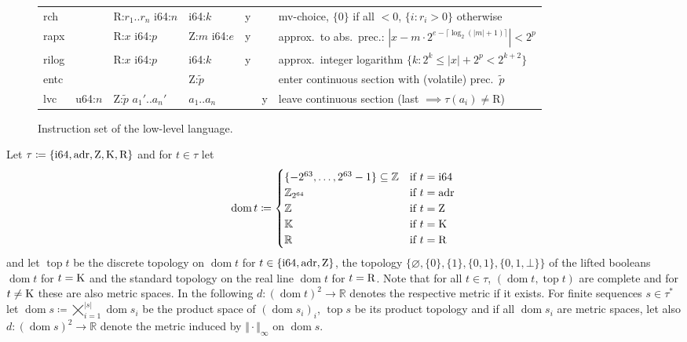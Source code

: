 \documentclass[a4paper,parskip=half]{scrartcl}
\begin{document}
\begin{figure}[h]
\begin{tabular}{l|l|l|l@{\;\,\vline\,}c@{\,\vline\,}c@{\,\vline\;\,}l}
  \ttfamily rch   &         & R:$r_1..r_n$ i64:$n$ & i64:$k$    &y&& mv-choice, $\{0\}$ if all $<0$, $\{i:r_i>0\}$ otherwise \\
  \ttfamily rapx  &         & R:$x$ i64:$p$   & Z:$m$ i64:$e$   &y&& approx.\ to abs.\ prec.: $|x-m\cdot2^{e-\lceil\log_2(|m|+1)\rceil}|<2^p$ \\
  \ttfamily rilog &         & R:$x$ i64:$p$   & i64:$k$         &y&& approx.\ integer logarithm $\{k:2^k\leq|x|+2^p<2^{k+2}\}$ \\
  \hline
  \ttfamily entc  &         &                           & Z:$\tilde p$ && & enter continuous section with (volatile) prec.\ $\tilde p$ \\
  \ttfamily lvc   & u64:$n$ & Z:$\tilde p$ $a_1'..a_n'$ & $a_1..a_n$   &&y& leave continuous section (last $\implies\tau(a_i)\neq\text{R}$)
\end{tabular}
\caption{Instruction set of the low-level language.}
\label{fig:instrs}
\end{figure}

\restoregeometry
\newpage

\newcommand*\dom{\operatorname{dom}}
\newcommand*\Top{\operatorname{top}}

Let $\tau\coloneqq\{\text{i64},\text{adr},\text Z,\text K,\text R\}$ and for
$t\in\tau$ let
\[ \dom t\coloneqq\begin{cases}
	\{-2^{63},\ldots,2^{63}-1\}\subseteq\mathbb Z &\text{if}~t=\text{i64} \\
	\mathbb Z_{2^{64}} &\text{if}~t=\text{adr} \\
	\mathbb Z &\text{if}~t=\text Z \\
	\mathbb K &\text{if}~t=\text K \\
	\mathbb R &\text{if}~t=\text R
\end{cases} \]
and let $\Top t$ be the discrete topology on $\dom t$ for $t\in\{\text{i64},\text{adr},\text Z\}$,
the topology $\{\varnothing,\{0\},\{1\},\{0,1\},\{0,1,\bot\}\}$ of the lifted
booleans $\dom t$ for $t=\text K$ and the standard topology on the real line
$\dom t$ for $t=\text R$. Note that for all $t\in\tau$, $(\dom t,\Top t)$ are
complete and for $t\neq\text K$ these are also metric spaces. In the following
$d:(\dom t)^2\to\mathbb R$ denotes the respective metric if it exists.
For finite sequences $s\in\tau^*$ let
$\dom s\coloneqq\bigtimes_{i=1}^{|s|}\dom s_i$
be the product space of $(\dom s_i)_i$, $\Top s$ be its product topology and
if all $\dom s_i$ are metric spaces, let also $d:(\dom s)^2\to\mathbb R$ denote
the metric induced by $\Vert\cdot\Vert_\infty$ on $\dom s$.
\end{document}
